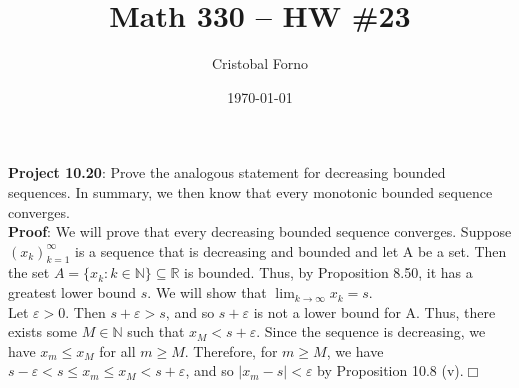 \documentclass[12]{article}
\title{Math 330 -- HW \#23}
\author{Cristobal Forno}
\date{\today}
\begin{document}
\maketitle

\textbf{Project 10.20}: Prove the analogous statement for decreasing bounded
sequences. In summary, we then know that every monotonic bounded sequence
converges. \\
\indent
\textbf{Proof}: We will prove that every decreasing bounded sequence converges.
Suppose $(x_k)_{k=1}^\infty$ is a sequence that is decreasing and bounded and
let A be a set. Then the set $A =
\{x_k:k \in \mathbb{N}\} \subseteq \mathbb{R}$ is bounded. Thus, by Proposition
8.50, it has a greatest lower bound $s$. We will show that $\lim_{k\to\infty}x_k
= s$.\\
\indent
Let $\varepsilon > 0$. Then $s+\varepsilon > s$, and so $s+\varepsilon$ is not a
lower bound for A. Thus, there exists some $M \in \mathbb{N}$ such that $x_M < s
+ \varepsilon$. Since the sequence is decreasing, we have $x_m \leq x_M$ for all
$m \geq M$. Therefore, for $m \geq M$, we have $s - \varepsilon < s \leq x_m
\leq x_M < s + \varepsilon$, and so $|x_m-s|<\varepsilon$ by Proposition 10.8 (v).$\Box$
\end{document}
